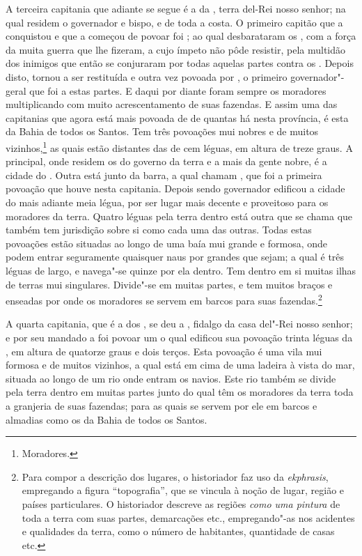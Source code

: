 A terceira capitania que adiante se segue é a da	, terra del-Rei nosso senhor; na qual residem o governador e			%
bispo, e  de toda a costa. O primeiro capitão que a
conquistou e que a começou de povoar foi ;
ao qual desbarataram os , com a força da muita guerra que lhe
fizeram, a cujo ímpeto não pôde resistir, pela multidão dos inimigos que
então se conjuraram por todas aquelas partes contra os	.
Depois disto, tornou a ser restituída e outra vez povoada por	, 
o primeiro governador"-geral que foi a estas partes. E daqui por
diante foram sempre os moradores multiplicando com muito
acrescentamento de suas fazendas. E assim uma das capitanias que agora
está mais povoada de  de quantas há nesta província, é esta
da Bahia de todos os Santos. Tem três povoações mui nobres e de muitos
vizinhos,\footnote{ Moradores.} as quais  estão distantes das de
 cem léguas, em altura de treze graus. A principal, onde
residem os do governo da terra e a mais da gente nobre, é a cidade do
. Outra está junto da barra, a qual chamam	, que foi
a primeira povoação que houve nesta capitania. Depois	
sendo governador edificou a cidade do	 mais adiante meia
légua, por ser lugar mais decente e proveitoso para os moradores da
terra. Quatro léguas pela terra dentro está outra que se chama	 
que também tem jurisdição sobre si como cada uma das outras. Todas estas
povoações estão situadas ao longo de uma baía mui grande e formosa,
onde podem entrar seguramente quaisquer naus por grandes que sejam; a
qual é três léguas de largo, e navega"-se quinze por ela dentro. Tem
dentro em si muitas ilhas de terras mui singulares. Divide"-se em muitas
partes, e tem muitos braços e enseadas por onde os moradores se servem
em barcos para suas fazendas.\footnote{ Para compor a descrição dos
lugares, o historiador faz uso da \textit{ekphrasis}, empregando a
figura ``topografia'', que se vincula à noção de lugar, região e
países particulares. O historiador descreve as regiões \textit{como uma 
pintura} de toda a terra com suas partes, demarcações etc.,
empregando"-as nos acidentes e qualidades da terra, como o número de
habitantes, quantidade de casas etc.}

A quarta capitania, que é a dos , se deu a , fidalgo da casa del"-Rei nosso senhor; e por seu mandado a foi
povoar um  o qual edificou sua povoação trinta léguas da , em altura de
quatorze graus e dois terços. Esta povoação é uma vila mui formosa e de
muitos vizinhos, a qual está em cima de uma ladeira à vista do mar,
situada ao longo de um rio onde entram os navios. Este rio também se
divide pela terra dentro em muitas partes junto do qual têm os
moradores da terra toda a granjeria de suas fazendas; para as quais se
servem por ele em barcos e almadias como os da Bahia de todos os Santos. 

